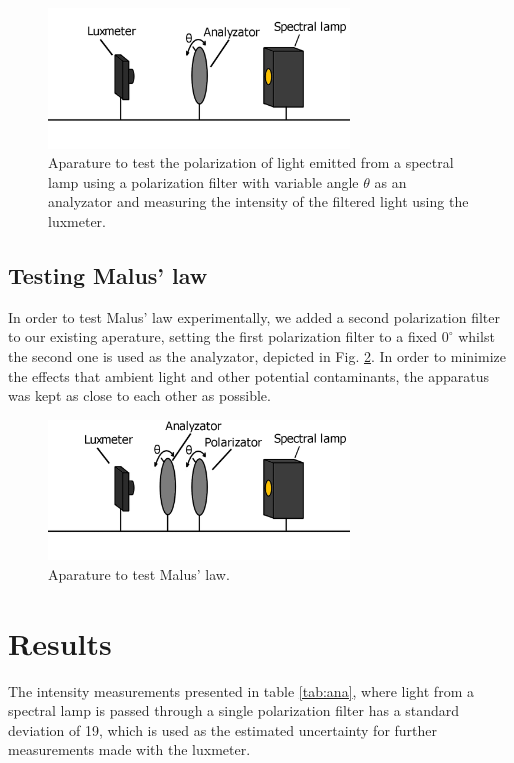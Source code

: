 \documentclass[11pt,a4paper]{article}
\begin{document}
  \begin{figure}[H]
    \center
    \includegraphics[width=8cm]{scripts/figs/diagram_1.png}
    \caption{Aparature to test the polarization of light emitted from a spectral lamp using a polarization filter with variable angle $\theta$ as an analyzator and measuring the intensity of the filtered light using the luxmeter.}
    \label{fig:lux_ana_lamp}
  \end{figure}

  \subsection{Testing Malus' law}

    In order to test Malus' law experimentally, we added a second polarization filter to our existing aperature, setting the first polarization filter to a fixed $0^\circ$ whilst the second one is used as the analyzator, depicted in Fig. \ref{fig:lux_ana_pola_lamp}. In order to minimize the effects that ambient light and other potential contaminants, the apparatus was kept as close to each other as possible. 

    \begin{figure}[H]
      \center
      \includegraphics[width=8cm]{scripts/figs/diagram_2.png}
      \caption{Aparature to test Malus' law.}
      \label{fig:lux_ana_pola_lamp}
    \end{figure}


\section{\label{sect:results}Results}
  
  The intensity measurements presented in table \ref{tab:ana}, where light from a spectral lamp is passed through a single polarization filter has a standard deviation of 19, which is used as the estimated uncertainty for further measurements made with the luxmeter.
\end{document}
